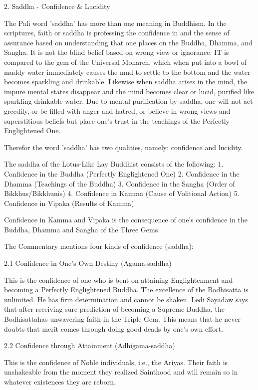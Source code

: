 2. Saddha - Confidence & Lucidity

The Pali word 'saddha' has more than one meaning in Buddhism. In the scriptures, faith or saddha is professing the confidence in and the sense of assurance based on understanding that one places on the Buddha, Dhamma, and Sangha. It is not the blind belief based on wrong view or ignorance. IT is compared to the gem of the Universal Monarch, which when put into a bowl of muddy water immediately causes the mud to settle to the bottom and the water becomes sparkling and drinkable. Likewise when saddha arises in the mind, the impure mental states disappear and the mind becomes clear or lucid, purified like sparkling drinkable water. Due to mental purification by saddha, one will not act greedily, or be filled with anger and hatred, or believe in wrong views and superstitious beliefs but place one's trust in the teachings of the Perfectly Englightened One.

Therefor the word 'saddha' has two qualities, namely: confidence and lucidity.

The saddha of the Lotus-Like Lay Buddhist consists of the following:
1. Confidence in the Buddha (Perfectly Englightened One)
2. Confidence in the Dhamma (Teachings of the Buddha)
3. Confidence in the Sangha (Order of Bikkhus/Bikkhunis)
4. Confidence in Kamma (Cause of Volitional Action)
5. Confidence in Vipaka (Results of Kamma)

Confidence in Kamma and Vipaka is the consequence of one's confidence in the Buddha, Dhamma and Sangha of the Three Gems.

The Commentary mentions four kinds of confidence (saddha):

2.1 Confidence in One's Own Destiny (Agama-saddha)

This is the confidence of one who is bent on attaining Englightenment and becoming a Perfectly Englightened Buddha. The excellence of the Bodhisatta is unlimited. He has firm determination and cannot be shaken. Ledi Sayadaw says that after receiving sure prediction of becoming a Supreme Buddha, the Bodhisattahas unwavering faith in the Triple Gem. This means that he never doubts that merit comes through doing good deads by one's own effort.

2.2 Confidence through Attainment (Adhigama-saddha)

This is the confidence of Noble individuals, i.e., the Ariyas. Their faith is unshakeable from the moment they realized Sainthood and will remain so in whatever existences they are reborn.

